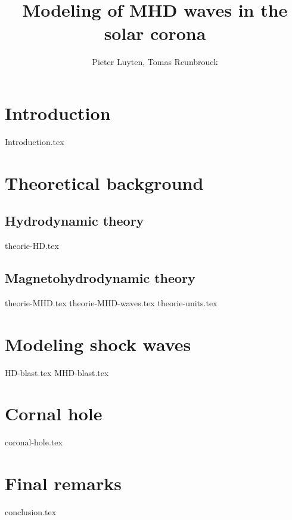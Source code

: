 \documentclass[a4paper]{article}
\title{Modeling of MHD waves in the solar corona}
\author{Pieter Luyten, Tomas Reunbrouck}
\begin{document}
\maketitle
\newpage
\tableofcontents
\newpage

\section{Introduction}
{Introduction.tex}
\newpage

\section{Theoretical background}

\subsection{Hydrodynamic theory}
{theorie-HD.tex}

\subsection{Magnetohydrodynamic theory}
{theorie-MHD.tex}
{theorie-MHD-waves.tex}
{theorie-units.tex}
\newpage

\section{Modeling shock waves}
{HD-blast.tex}
\newpage
{MHD-blast.tex}
\newpage

\section{Cornal hole}
{coronal-hole.tex}
\newpage

\section{Final remarks}
{conclusion.tex}


\end{document}
